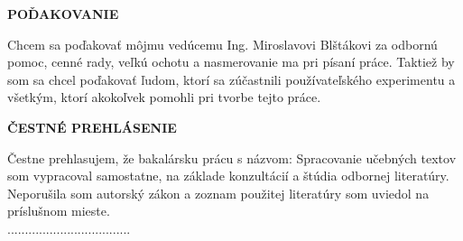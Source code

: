 \newpage
\thispagestyle{plain}
\vspace*{15cm} 
\begin{large}
\noindent
\textbf{POĎAKOVANIE} \\
\end{large}
\noindent
Chcem sa poďakovať môjmu vedúcemu Ing. Miroslavovi Blštákovi za odbornú pomoc, cenné rady, veľkú ochotu a nasmerovanie ma pri písaní práce. Taktiež by som sa chcel poďakovať ľudom, ktorí sa zúčastnili používateľského experimentu a všetkým, ktorí akokoľvek pomohli pri tvorbe tejto práce.
\newpage
\thispagestyle{plain}
\vspace*{15cm} 
\begin{large}
\noindent
\textbf{ČESTNÉ PREHLÁSENIE} \\
\end{large}
\noindent
Čestne prehlasujem, že bakalársku prácu s názvom: Spracovanie učebných textov som vypracoval samostatne, na základe konzultácií a štúdia odbornej literatúry. Neporušila som autorský zákon a zoznam použitej literatúry som uviedol na príslušnom mieste.\vspace*{0.5cm}\\
\hspace*{10cm}...................................\\
\hspace*{10.7cm} \Author